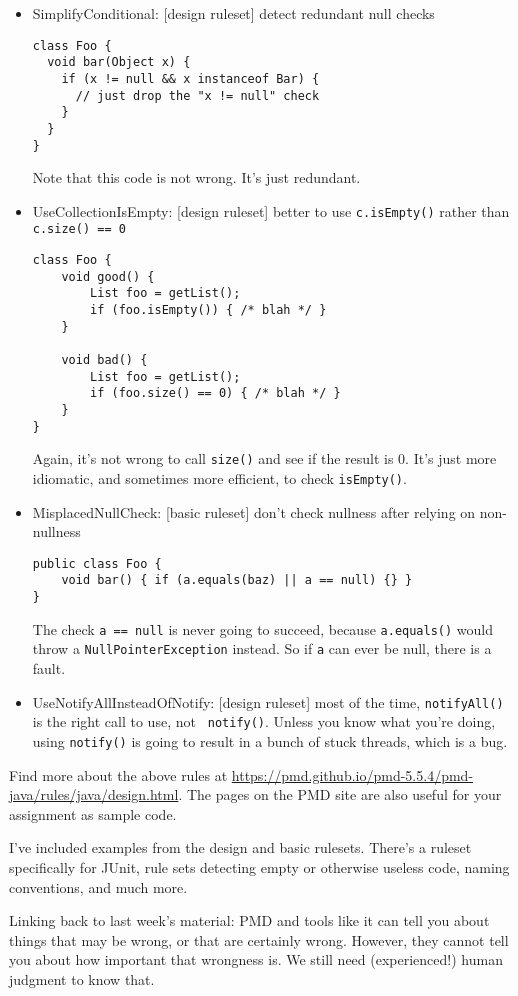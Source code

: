\documentclass[11pt]{article}
\begin{document}
\begin{itemize}[noitemsep]
\item SimplifyConditional: [design ruleset] detect redundant null checks
\begin{lstlisting}
class Foo {
  void bar(Object x) {
    if (x != null && x instanceof Bar) {
      // just drop the "x != null" check
    }
  }
}
\end{lstlisting}
Note that this code is not wrong. It's just redundant.
\item UseCollectionIsEmpty: [design ruleset] better to use {\tt c.isEmpty()} rather than {\tt c.size() == 0}
\begin{lstlisting}
class Foo {
    void good() {
        List foo = getList();
        if (foo.isEmpty()) { /* blah */ }
    }

    void bad() {
        List foo = getList();
        if (foo.size() == 0) { /* blah */ }
    }
}
\end{lstlisting}
Again, it's not wrong to call {\tt size()} and see if the result is 0.
It's just more idiomatic, and sometimes more efficient, to check {\tt isEmpty()}.
\item MisplacedNullCheck: [basic ruleset] don't check nullness after relying on non-nullness
\begin{lstlisting}
public class Foo {
    void bar() { if (a.equals(baz) || a == null) {}	}
}
\end{lstlisting}
The check {\tt a == null} is never going to succeed, because {\tt a.equals()} would
throw a {\tt NullPointerException} instead. So if {\tt a} can ever be null, there is
a fault.
\item UseNotifyAllInsteadOfNotify: [design ruleset] most of the time,
  {\tt notifyAll()} is the right call to use, not {\tt
    notify()}. Unless you know what you're doing, using {\tt notify()}
  is going to result in a bunch of stuck threads, which is a bug.
\end{itemize}

Find more about the above rules at 
\url{https://pmd.github.io/pmd-5.5.4/pmd-java/rules/java/design.html}.
The pages on the PMD site are also useful for your assignment as sample code.

I've included examples from the design and basic rulesets. There's a ruleset 
specifically for JUnit, rule sets detecting empty or otherwise useless
code, naming conventions, and much more.

Linking back to last week's material: PMD and tools like it can tell you about
things that may be wrong, or that are certainly wrong. However, they cannot
tell you about how important that wrongness is. We still need (experienced!)
human judgment to know that.
\end{document}
